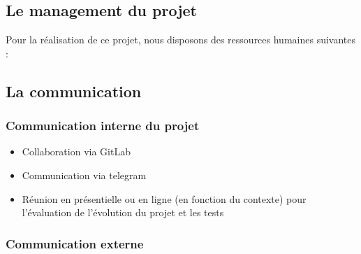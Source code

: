 \subsection{Le management du projet}

Pour la réalisation de ce projet, nous disposons des ressources humaines suivantes :

\begin{table}[H]
	\centering
	\caption{Le management du projet}
	\label{tab:my-table}
\end{table}

\subsection{La communication}


\subsubsection{Communication interne du projet}

\begin{itemize}
	\item Collaboration via GitLab
	\item Communication via telegram
	\item Réunion en présentielle ou en ligne (en fonction du contexte) pour l’évaluation de l’évolution du projet et les tests
\end{itemize}

\subsubsection{Communication externe}

